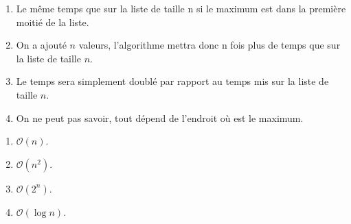 
\begin{enumerate}
\item Le même temps que sur la liste de taille n si le maximum est dans la première moitié de la liste.
\item On a ajouté $n$ valeurs, l'algorithme mettra donc n fois plus de temps que sur la liste de taille $n$.
\item Le temps sera simplement doublé par rapport au temps mis sur la liste de taille $n$.%
\item On ne peut pas savoir, tout dépend de l'endroit où est le maximum.
\end{enumerate}


\begin{enumerate}
\item $\mathcal{O}(n)$.
\item $\mathcal{O}\left(n^2\right)$.%
\item $\mathcal{O}\left(2^n\right)$.
\item $\mathcal{O}\left(\log n\right)$.
\end{enumerate}


